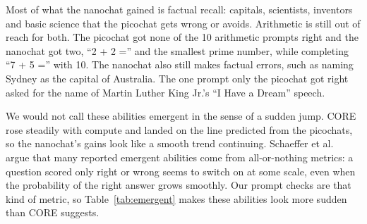\documentclass[11pt]{article}
\begin{document}
Most of what the nanochat gained is factual recall: capitals, scientists, inventors and basic science that the picochat gets wrong or avoids. Arithmetic is still out of reach for both. The picochat got none of the 10 arithmetic prompts right and the nanochat got two, ``2 + 2 ='' and the smallest prime number, while completing ``7 + 5 ='' with 10. The nanochat also still makes factual errors, such as naming Sydney as the capital of Australia. The one prompt only the picochat got right asked for the name of Martin Luther King Jr.'s ``I Have a Dream'' speech.

We would not call these abilities emergent in the sense of a sudden jump. CORE rose steadily with compute and landed on the line predicted from the picochats, so the nanochat's gains look like a smooth trend continuing. Schaeffer et al.\ \cite{schaeffer-mirage} argue that many reported emergent abilities come from all-or-nothing metrics: a question scored only right or wrong seems to switch on at some scale, even when the probability of the right answer grows smoothly. Our prompt checks are that kind of metric, so Table~\ref{tab:emergent} makes these abilities look more sudden than CORE suggests.
\end{document}

